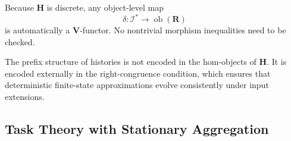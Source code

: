 \documentclass[12pt]{article}
\theoremstyle{definition}
\begin{document}
Because $\mathbf H$ is discrete, any object-level map
\[
\delta:\mathcal I^*\to\operatorname{ob}(\mathbf R)
\]
is automatically a $\mathbf V$-functor.  No nontrivial morphism inequalities
need to be checked.

The prefix structure of histories is not encoded in the hom-objects of
$\mathbf H$.  It is encoded externally in the right-congruence condition,
which ensures that deterministic finite-state approximations evolve
consistently under input extensions.

\subsection{Task Theory with Stationary Aggregation}
\label{subsec:task-theory}
\end{document}
